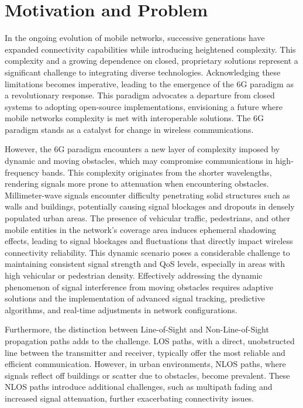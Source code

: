 \section{Motivation and Problem}

In the ongoing evolution of mobile networks, successive generations have expanded connectivity capabilities while introducing heightened complexity. This complexity and a growing dependence on closed, proprietary solutions represent a significant challenge to integrating diverse technologies. Acknowledging these limitations becomes imperative, leading to the emergence of the 6G paradigm as a revolutionary response. This paradigm advocates a departure from closed systems to adopting open-source implementations, envisioning a future where mobile networks complexity is met with interoperable solutions. The 6G paradigm stands as a catalyst for change in wireless communications.

However, the 6G paradigm encounters a new layer of complexity imposed by dynamic and moving obstacles,  which may compromise communications in high-frequency bands. This complexity originates from the shorter wavelengths, rendering signals more prone to attenuation when encountering obstacles. Millimeter-wave signals encounter difficulty penetrating solid structures such as walls and buildings, potentially causing signal blockages and dropouts in densely populated urban areas. The presence of vehicular traffic, pedestrians, and other mobile entities in the network's coverage area induces ephemeral shadowing effects, leading to signal blockages and fluctuations that directly impact wireless connectivity reliability. This dynamic scenario poses a considerable challenge to maintaining consistent signal strength and QoS levels, especially in areas with high vehicular or pedestrian density. Effectively addressing the dynamic phenomenon of signal interference from moving obstacles requires adaptive solutions and the implementation of advanced signal tracking, predictive algorithms, and real-time adjustments in network configurations. 

Furthermore, the distinction between Line-of-Sight and Non-Line-of-Sight propagation paths adds to the challenge. LOS paths, with a direct, unobstructed line between the transmitter and receiver, typically offer the most reliable and efficient communication. However, in urban environments, NLOS paths, where signals reflect off buildings or scatter due to obstacles, become prevalent. These NLOS paths introduce additional challenges, such as multipath fading and increased signal attenuation, further exacerbating connectivity issues.

